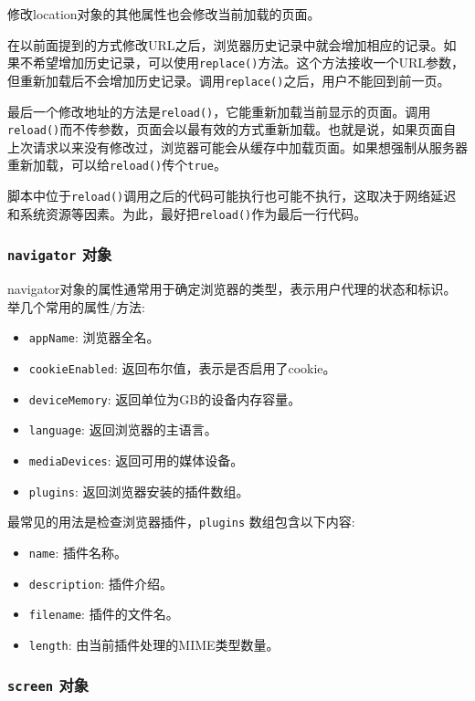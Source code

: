 修改location对象的其他属性也会修改当前加载的页面。

在以前面提到的方式修改URL之后，浏览器历史记录中就会增加相应的记录。如果不希望增加历史记录，可以使用\texttt{replace()}方法。这个方法接收一个URL参数，但重新加载后不会增加历史记录。调用\texttt{replace()}之后，用户不能回到前一页。

最后一个修改地址的方法是\texttt{reload()}，它能重新加载当前显示的页面。调用\texttt{reload()}而不传参数，页面会以最有效的方式重新加载。也就是说，如果页面自上次请求以来没有修改过，浏览器可能会从缓存中加载页面。如果想强制从服务器重新加载，可以给\texttt{reload()}传个\texttt{true}。

脚本中位于\texttt{reload()}调用之后的代码可能执行也可能不执行，这取决于网络延迟和系统资源等因素。为此，最好把\texttt{reload()}作为最后一行代码。

\subsubsection*{\texttt{navigator} 对象}

navigator对象的属性通常用于确定浏览器的类型，表示用户代理的状态和标识。举几个常用的属性/方法:

\begin{itemize}
    \item \texttt{appName}: 浏览器全名。
    \item \texttt{cookieEnabled}: 返回布尔值，表示是否启用了cookie。
    \item \texttt{deviceMemory}: 返回单位为GB的设备内存容量。
    \item \texttt{language}: 返回浏览器的主语言。
    \item \texttt{mediaDevices}: 返回可用的媒体设备。
    \item \texttt{plugins}: 返回浏览器安装的插件数组。
\end{itemize}

最常见的用法是检查浏览器插件，\texttt{plugins} 数组包含以下内容:
\begin{itemize}
    \item \texttt{name}: 插件名称。
    \item \texttt{description}: 插件介绍。
    \item \texttt{filename}: 插件的文件名。
    \item \texttt{length}: 由当前插件处理的MIME类型数量。
\end{itemize}

\subsubsection*{\texttt{screen} 对象}

